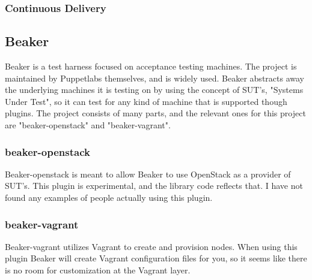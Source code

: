 \subsubsection{Continuous Delivery}

\cite{cddef}

\subsection{Beaker}

Beaker\cite{beakergithub} is a test harness focused on acceptance testing machines. The project is maintained by Puppetlabs themselves, and is widely used. Beaker abstracts away the underlying machines it is testing on by using the concept of SUT's, "Systems Under Test", so it can test for any kind of machine that is supported though plugins. The project consists of many parts, and the relevant ones for this project are "beaker-openstack"\cite{beakeropenstackgithub} and "beaker-vagrant"\cite{beakervagrantgithub}.



\subsubsection{beaker-openstack}

Beaker-openstack is meant to allow Beaker to use OpenStack as a provider of SUT's. This plugin is experimental, and the library code reflects that. I have not found any examples of people actually using this plugin.

\subsubsection{beaker-vagrant}

Beaker-vagrant utilizes Vagrant to create and provision nodes. When using this plugin Beaker will create Vagrant configuration files for you, so it seems like there is no room for customization at the Vagrant layer.

